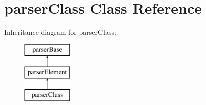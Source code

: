 \hypertarget{classparser_class}{\section{parser\-Class \-Class \-Reference}
\label{classparser_class}
}
\-Inheritance diagram for parser\-Class\-:\begin{figure}[H]
\begin{center}
\leavevmode
\includegraphics[height=3.000000cm]{classparser_class}
\end{center}
\end{figure}
